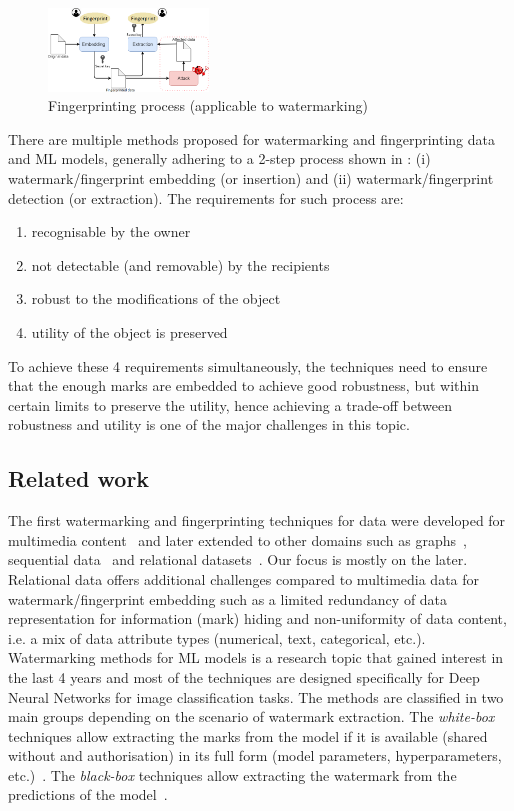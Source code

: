 \documentclass[conference]{IEEEtran}
\begin{document}
\begin{figure}
    \centering
    \includegraphics[width=0.38\textwidth]{figures/fingerprint-process.png}
    \caption{Fingerprinting process (applicable to watermarking)}
    \label{fig:process}
\end{figure}

There are multiple methods proposed for watermarking and fingerprinting data and ML models, generally adhering to a 2-step process shown in : (i) watermark/fingerprint embedding (or insertion) and (ii) watermark/fingerprint detection (or extraction). 
The requirements for such process are:
\begin{enumerate}
    \item recognisable by the owner
    \item not detectable (and removable) by the recipients
    \item robust to the modifications of the object
    \item utility of the object is preserved
\end{enumerate}
To achieve these 4 requirements simultaneously, the techniques need to ensure that the enough marks are embedded to achieve good robustness, but within certain limits to preserve the utility, hence achieving a trade-off between robustness and utility is one of the major challenges in this topic. 

\subsection{Related work}
The first watermarking and fingerprinting techniques for data were developed for multimedia content~\cite{trappe2003anti} and later extended to other domains such as graphs~\cite{piec2014watermarking}, sequential data~\cite{ayday2019robust} and relational datasets~\cite{agrawal2002watermarking,li2005fingerprinting}. 
Our focus is mostly on the later. 
Relational data offers additional challenges compared to multimedia data for watermark/fingerprint embedding such as a limited redundancy of data representation for information (mark) hiding and non-uniformity of data content, i.e. a mix of data attribute types (numerical, text, categorical, etc.). 
Watermarking methods for ML models is a research topic that gained interest in the last 4 years and most of the techniques are designed specifically for Deep Neural Networks for image classification tasks. 
The methods are classified in two main groups depending on the scenario of watermark extraction. 
The \textit{white-box} techniques allow extracting the marks from the model if it is available (shared without and authorisation) in its full form (model parameters, hyperparameters, etc.)~\cite{darvish2019deepsigns,chen2019deepmarks}. 
The \textit{black-box} techniques allow extracting the watermark from the predictions of the model~\cite{chen2019blackmarks,adi2018turning,zhang2018protecting}. 
\end{document}
